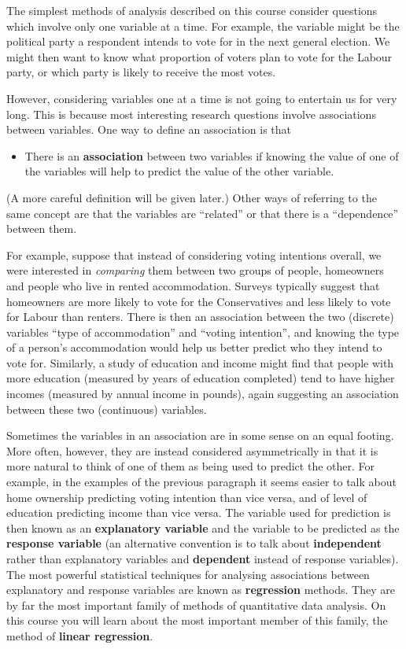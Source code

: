The simplest methods of analysis described on this course consider
questions which involve only one variable at a time. For example, the
variable might be the political party a respondent intends to vote for
in the next general election. We might then want to know what proportion
of voters plan to vote for the Labour party, or which party is likely
to receive the most votes.

However,
considering variables one at a time is not going
to entertain us for very long. This is
because most interesting research questions involve associations between
variables. One way to define an association is
that
\begin{itemize}
\item
There is an \textbf{association} between two variables if knowing the
value of one of the variables will help to predict the value of the
other variable.
\end{itemize}
(A more careful definition will be given later.)
Other ways of referring to the same concept are that the variables are
``related'' or that there is a ``dependence'' between them.

For example, suppose that instead of considering voting intentions
overall, we were interested in \emph{comparing} them between two groups
of people, homeowners and people who live in rented accommodation.
Surveys typically suggest that homeowners are more likely to vote for
the Conservatives and less likely to vote for Labour than renters. There
is then an association between the two (discrete) variables ``type of
accommodation'' and ``voting intention'', and knowing the type of a
person's accommodation would help us better predict who they intend to
vote for. Similarly, a study of education and income might find that
people with more education (measured by years of education completed)
tend to have higher incomes (measured by annual income in pounds), again
suggesting an association between these two (continuous) variables.

Sometimes the variables in an association are in some sense on an equal
footing. More often, however, they are instead considered asymmetrically
in that it is more natural to think of one of them as being used to
predict the other. For example, in the examples of the previous
paragraph it seems easier to talk about home ownership predicting voting
intention than vice versa, and of level of education predicting income
than vice versa. The variable used for prediction is then known as an
\textbf{explanatory variable} and the variable to be predicted as the
\textbf{response variable} (an alternative convention is to talk about
\textbf{independent} rather than explanatory variables and
\textbf{dependent} instead of response variables). The most powerful
statistical techniques for analysing associations between explanatory
and response variables are known as \textbf{regression} methods. They
are by far the most important family of methods of quantitative data
analysis. On this course you will learn about the most important member
of this family, the method of \textbf{linear regression}.

